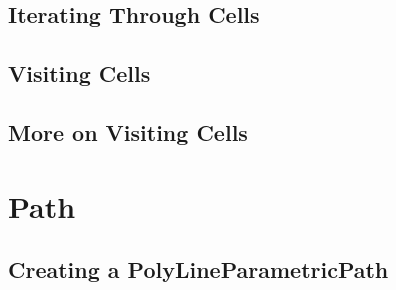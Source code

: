 \subsection{Iterating Through Cells}
\label{sec:MeshCellsIteration}




\subsection{Visiting Cells}
\label{sec:MeshCellVisitor}




\subsection{More on Visiting Cells}
\label{sec:MeshCellVisitorMultipleType}




\section{Path}\label{PathSection}

\subsection{Creating a PolyLineParametricPath}
\label{sec:CreatingAPolyLineParametricPath}


